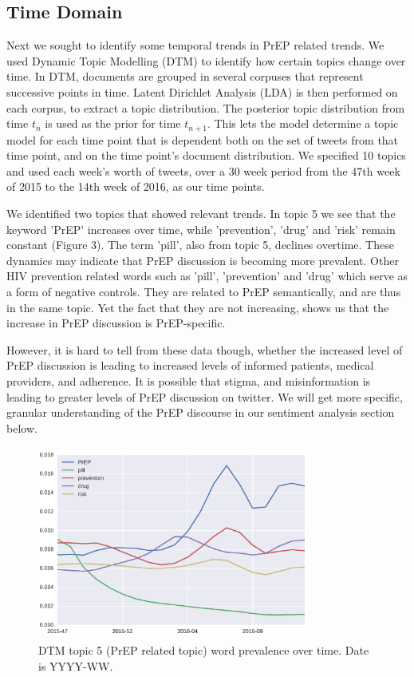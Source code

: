 \documentclass{sig-alternate-05-2015}
\begin{document}
\subsection{Time Domain}

Next we sought to identify some temporal trends in PrEP related trends. We used Dynamic Topic Modelling (DTM) to identify how certain topics change over time. In DTM, documents are grouped in several corpuses that represent successive points in time. Latent Dirichlet Analysis (LDA) is then performed on each corpus, to extract a topic distribution. The posterior topic distribution from time $t_n$ is used as the prior for time $t_{n+1}$. This lets the model determine a topic model for each time point that is dependent both on the set of tweets from that time point, and on the time point's document distribution. We specified 10 topics and used each week's worth of tweets, over a 30 week period from the 47th week of 2015 to the 14th week of 2016, as our time points.

We identified two topics that showed relevant trends. In topic 5 we see that the keyword 'PrEP' increases over time, while 'prevention', 'drug' and 'risk' remain constant (Figure 3). The term 'pill', also from topic 5, declines overtime. These dynamics may indicate that PrEP discussion is becoming more prevalent. Other HIV prevention related words such as 'pill', 'prevention' and 'drug' which serve as a form of negative controls. They are related to PrEP semantically, and are thus in the same topic. Yet the fact that they are not increasing, shows us that the increase in PrEP discussion is PrEP-specific.

However, it is hard to tell from these data though, whether the increased level of PrEP discussion is leading to increased levels of informed patients, medical providers, and adherence. It is possible that stigma, and misinformation is leading to greater levels of PrEP discussion on twitter. We will get more specific, granular understanding of the PrEP discourse in our sentiment analysis section below.

\begin{figure}
\centering
\includegraphics[height=2.5in, width=3.5in]{DTMfig1}
\caption{DTM topic 5 (PrEP related topic) word prevalence over time. Date is YYYY-WW.}
\end{figure}
\end{document}
